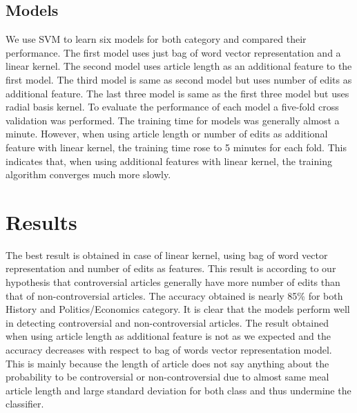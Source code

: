\documentclass[twocolumn]{article}
\newcommand{\comment}[1]{}
\begin{document}
  \subsection{Models}
  	We use SVM to learn six models for both category and compared their
performance. The first model uses just bag of word vector representation
and a linear kernel. The second model uses article length as an additional 
feature to the first model. The third model is same as second model but uses
number of edits as additional feature. The last three model is same as the
first three model but uses radial basis kernel. To evaluate the performance of
each model a five-fold cross validation was performed. The training time for
models was generally almost a minute. However, when using article length or 
number of edits as additional feature with linear kernel, the training time
rose to 5 minutes for each fold. This indicates that, when using additional
features with linear kernel, the training algorithm converges much more slowly.
 \comment{

 Use the following format for figures:

 \begin{figure}[t]
         \centering
         \texttt{[image: figure\_file]}
         \caption{This figure explains this.}
         \label{fig:block}
 \end{figure}

 And refer as Figure \ref{fig:block}.

 }
 \section{Results}

 The best result is obtained in case of linear kernel, using bag of word
 vector representation and number of edits as features. This result is 
 according to our hypothesis that controversial articles generally have 
 more number of edits than that of non-controversial articles. The accuracy 
 obtained is nearly 85\% for both History and Politics/Economics category.
 It is clear that the models perform well in detecting controversial and 
 non-controversial articles. The result obtained when using article length
 as additional feature is not as we expected and the accuracy decreases with
 respect to bag of words vector representation model. This is mainly because
 the length of article does not say anything about the probability to be 
 controversial or non-controversial due to almost same meal article length 
 and large standard deviation for both class and thus undermine the classifier.
 
\end{document}
